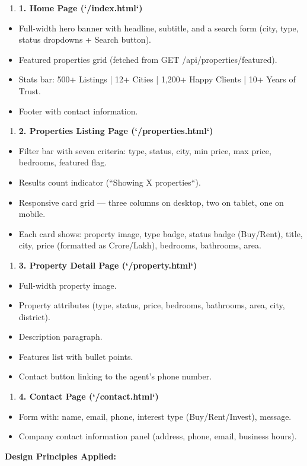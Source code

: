 \documentclass[12pt,a4paper]{report}
\begin{document}
\begin{enumerate}
  \item \textbf{1. Home Page (`/index.html`)}
\end{enumerate}
\begin{itemize}
  \item \textbullet{} Full-width hero banner with headline, subtitle, and a search form (city, type, status dropdowns + Search button).
  \item \textbullet{} Featured properties grid (fetched from GET /api/properties/featured).
  \item \textbullet{} Stats bar: 500+ Listings | 12+ Cities | 1,200+ Happy Clients | 10+ Years of Trust.
  \item \textbullet{} Footer with contact information.
\end{itemize}
\begin{enumerate}
  \item \textbf{2. Properties Listing Page (`/properties.html`)}
\end{enumerate}
\begin{itemize}
  \item \textbullet{} Filter bar with seven criteria: type, status, city, min price, max price, bedrooms, featured flag.
  \item \textbullet{} Results count indicator (``Showing X properties``).
  \item \textbullet{} Responsive card grid --- three columns on desktop, two on tablet, one on mobile.
  \item \textbullet{} Each card shows: property image, type badge, status badge (Buy/Rent), title, city, price (formatted as Crore/Lakh), bedrooms, bathrooms, area.
\end{itemize}
\begin{enumerate}
  \item \textbf{3. Property Detail Page (`/property.html`)}
\end{enumerate}
\begin{itemize}
  \item \textbullet{} Full-width property image.
  \item \textbullet{} Property attributes (type, status, price, bedrooms, bathrooms, area, city, district).
  \item \textbullet{} Description paragraph.
  \item \textbullet{} Features list with bullet points.
  \item \textbullet{} Contact button linking to the agent's phone number.
\end{itemize}
\begin{enumerate}
  \item \textbf{4. Contact Page (`/contact.html`)}
\end{enumerate}
\begin{itemize}
  \item \textbullet{} Form with: name, email, phone, interest type (Buy/Rent/Invest), message.
  \item \textbullet{} Company contact information panel (address, phone, email, business hours).
\end{itemize}
\textbf{Design Principles Applied:}
\end{document}
